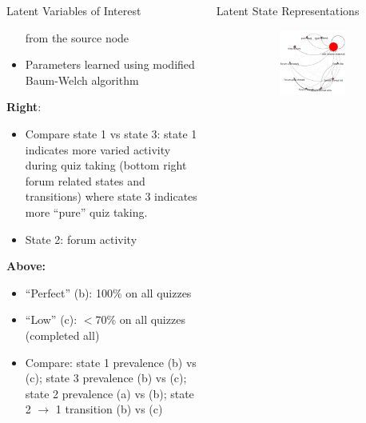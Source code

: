 \documentclass[final,t]{beamer}
\newcommand{\msp}[0]{\\[0.5\baselineskip]}
\begin{document}
\begin{frame}[fragile]
\begin{columns}[t]
\begin{column}{0.6\textwidth}
\begin{block}{Latent Variables of Interest}
\begin{itemize}
            from the source node
          \item Parameters learned using modified Baum-Welch
            algorithm\msp{}
        \end{itemize}
        \textbf{Right}:
        \begin{itemize}
          \item Compare state 1 vs state 3: state 1 indicates more varied
            activity during quiz taking (bottom right forum related states
            and transitions) where state 3 indicates more ``pure'' quiz
            taking.
          \item State 2: forum activity\msp{}
        \end{itemize}
        \textbf{Above:}
        \begin{itemize}
          \item ``Perfect'' (b): 100\% on all quizzes
          \item ``Low'' (c): $< 70\%$ on all quizzes (completed all)
          \item Compare: state 1 prevalence (b) vs (c); state 3 prevalence
            (b) vs (c); state 2 prevalence (a) vs (b); state 2
            $\rightarrow$ 1 transition (b) vs (c)
        \end{itemize}
      \end{block}
    \end{column}
    \begin{column}{0.3\textwidth}
      \begin{block}{Latent State Representations}
        \begin{figure}
          \centering
          \begin{subfigure}[t]{0.9\textwidth}
            \includegraphics[width=\textwidth]{../../figures/text-4state/state0.png}

\end{subfigure}
\end{figure}
\end{block}
\end{column}
\end{columns}
\end{frame}
\end{document}
